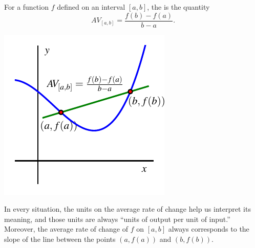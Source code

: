 \documentclass[nooutcomes]{ximera}
\begin{document}
\begin{definition}
For a function \(f\) defined on an interval \([a,b]\), the  is the quantity%
\begin{equation*}
AV_{[a,b]} = \frac{f(b) - f(a)}{b-a}\text{.}
\end{equation*}

\begin{image}
\includegraphics{aroc-f-x-defn}
\end{image}

\end{definition}
In every situation, the units on the average rate of change help us interpret its meaning, and those units are always ``units of output per unit of input.''   Moreover, the average rate of change of \(f\) on \([a,b]\) always corresponds to the slope of the line between the points \((a,f(a))\) and \((b,f(b))\).
\end{document}
